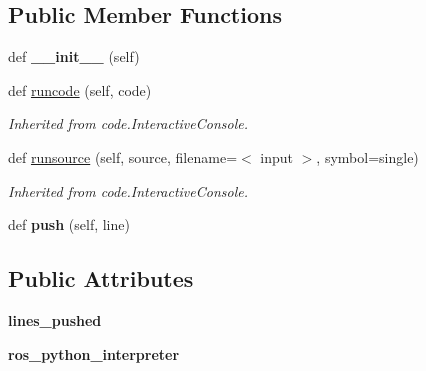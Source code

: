 \subsection*{Public Member Functions}
\begin{DoxyCompactItemize}
\item 
def {\bfseries \+\_\+\+\_\+init\+\_\+\+\_\+} (self)\hypertarget{classros__nodes_1_1run__command_1_1DynamicGraphInteractiveConsole_a07b741ddfb4d749aca2d5ffe9e600b3d}{}\label{classros__nodes_1_1run__command_1_1DynamicGraphInteractiveConsole_a07b741ddfb4d749aca2d5ffe9e600b3d}

\item 
def \hyperlink{classros__nodes_1_1run__command_1_1DynamicGraphInteractiveConsole_a2ef2227d691887e3dd6675c0df5acc2c}{runcode} (self, code)
\begin{DoxyCompactList}\small\item\em Inherited from code.\+Interactive\+Console. \end{DoxyCompactList}\item 
def \hyperlink{classros__nodes_1_1run__command_1_1DynamicGraphInteractiveConsole_a20a3fd5163e9cd015837fde8e6cead02}{runsource} (self, source, filename=\textquotesingle{}$<$ input $>$\textquotesingle{}, symbol=\textquotesingle{}single\textquotesingle{})
\begin{DoxyCompactList}\small\item\em Inherited from code.\+Interactive\+Console. \end{DoxyCompactList}\item 
def {\bfseries push} (self, line)\hypertarget{classros__nodes_1_1run__command_1_1DynamicGraphInteractiveConsole_abf532b80ab37a9938e353e98e9a5c5a7}{}\label{classros__nodes_1_1run__command_1_1DynamicGraphInteractiveConsole_abf532b80ab37a9938e353e98e9a5c5a7}

\end{DoxyCompactItemize}
\subsection*{Public Attributes}
\begin{DoxyCompactItemize}
\item 
{\bfseries lines\+\_\+pushed}\hypertarget{classros__nodes_1_1run__command_1_1DynamicGraphInteractiveConsole_a1d64acd7b772889fc847983bfefc5a79}{}\label{classros__nodes_1_1run__command_1_1DynamicGraphInteractiveConsole_a1d64acd7b772889fc847983bfefc5a79}

\item 
{\bfseries ros\+\_\+python\+\_\+interpreter}\hypertarget{classros__nodes_1_1run__command_1_1DynamicGraphInteractiveConsole_a50579867ed5087f14bf681356cdcf914}{}\label{classros__nodes_1_1run__command_1_1DynamicGraphInteractiveConsole_a50579867ed5087f14bf681356cdcf914}

\end{DoxyCompactItemize}


